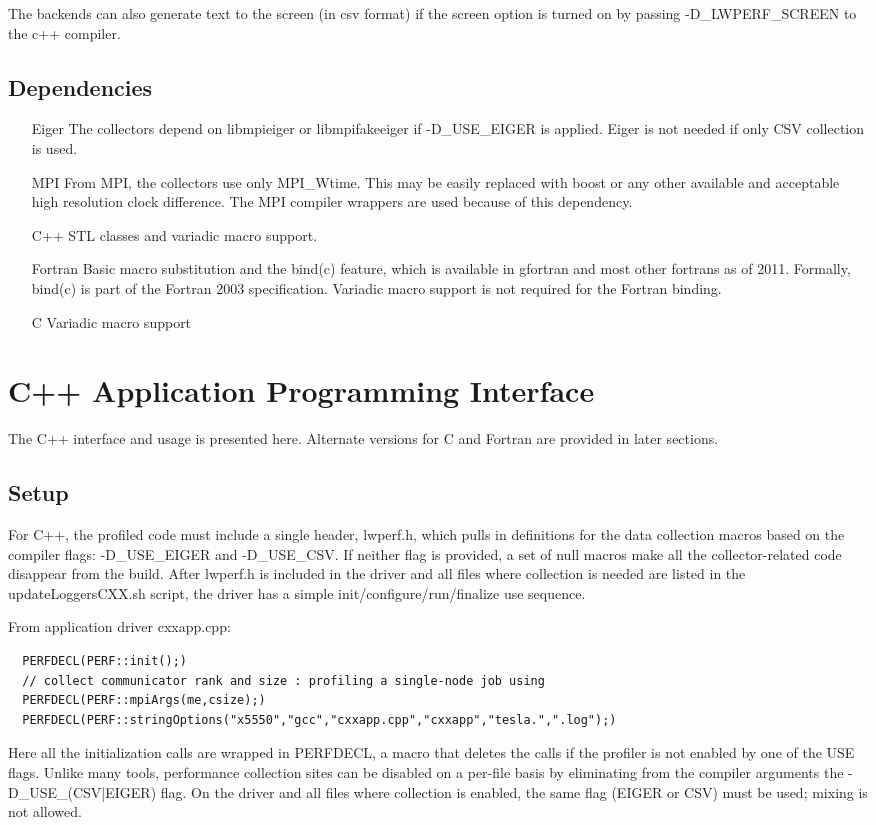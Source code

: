 \documentclass{article}
\begin{document}
The backends can also generate text to the screen (in csv format) if the screen option is turned on by passing -D\_LWPERF\_SCREEN to the c++ compiler.


\subsection{Dependencies}
\begin{itemize}
\item[Eiger] The collectors depend on libmpieiger or libmpifakeeiger if -D\_USE\_EIGER is applied. Eiger is not needed if only CSV collection is used.
\item[MPI] From MPI, the collectors use only MPI\_Wtime. This may be easily replaced with boost or any other available and acceptable high resolution clock difference. The MPI compiler wrappers are used because of this dependency.
\item[C++] STL classes and variadic macro support.
\item[Fortran] Basic macro substitution and the bind(c) feature, which is available in gfortran and most other fortrans as of 2011. Formally, bind(c) is part of the Fortran 2003 specification. Variadic macro support is not required for the Fortran binding.
\item[C] Variadic macro support
\end{itemize}

\section{C++ Application Programming Interface}
The C++ interface and usage is presented here. Alternate versions for C and Fortran are provided in later sections.
\label{sec:api}
\subsection{Setup}
For C++, the profiled code must include a single header, lwperf.h, which pulls in definitions for the data collection macros based on the compiler flags: -D\_USE\_EIGER and -D\_USE\_CSV. If neither flag is provided, a set of null macros make all the collector-related code disappear from the build.
After lwperf.h is included in the driver and all files where collection is needed are listed in the updateLoggersCXX.sh script, the driver has a simple init/configure/run/finalize use sequence. 

From application driver cxxapp.cpp:
\begin{verbatim}
  PERFDECL(PERF::init();)
  // collect communicator rank and size : profiling a single-node job using
  PERFDECL(PERF::mpiArgs(me,csize);)
  PERFDECL(PERF::stringOptions("x5550","gcc","cxxapp.cpp","cxxapp","tesla.",".log");)
\end{verbatim}
Here all the initialization calls are wrapped in PERFDECL, a macro that deletes the calls if the profiler is not enabled by one of the USE flags. Unlike many tools, performance collection sites can be disabled on a per-file basis by eliminating from the compiler arguments the -D\_USE\_(CSV|EIGER) flag. On the driver and all files where collection is enabled, the same flag (EIGER or CSV) must be used; mixing is not allowed. 
\end{document}
